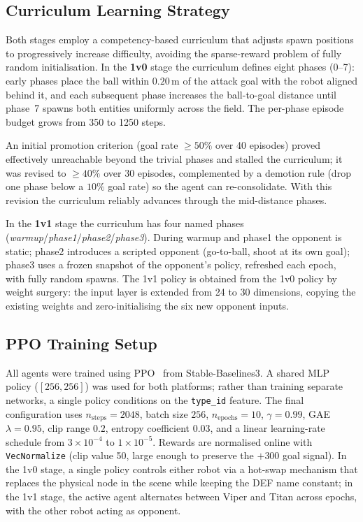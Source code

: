 \documentclass[conference]{IEEEtran}
\begin{document}
\subsection{Curriculum Learning Strategy}
Both stages employ a competency-based curriculum that adjusts spawn positions to
progressively increase difficulty, avoiding the sparse-reward problem of fully
random initialisation. In the \textbf{1v0} stage the curriculum defines eight
phases (0--7): early phases place the ball within $0.20\,\mathrm{m}$ of the attack
goal with the robot aligned behind it, and each subsequent phase increases the
ball-to-goal distance until phase~7 spawns both entities uniformly across the
field. The per-phase episode budget grows from 350 to 1250 steps.

An initial promotion criterion (goal rate $\geq 50\%$ over 40 episodes) proved
effectively unreachable beyond the trivial phases and stalled the curriculum; it
was revised to $\geq 40\%$ over 30 episodes, complemented by a demotion rule (drop
one phase below a $10\%$ goal rate) so the agent can re-consolidate. With this
revision the curriculum reliably advances through the mid-distance phases.

In the \textbf{1v1} stage the curriculum has four named phases
(\textit{warmup}/\textit{phase1}/\textit{phase2}/\textit{phase3}). During warmup and
phase1 the opponent is static; phase2 introduces a scripted opponent (go-to-ball,
shoot at its own goal); phase3 uses a frozen snapshot of the opponent's policy,
refreshed each epoch, with fully random spawns. The 1v1 policy is obtained from the
1v0 policy by weight surgery: the input layer is extended from 24 to 30 dimensions,
copying the existing weights and zero-initialising the six new opponent inputs.

\subsection{PPO Training Setup} \label{sec:ppo_setup}
All agents were trained using PPO~\cite{schulman2017ppo} from Stable-Baselines3. A
shared MLP policy ($[256,256]$) was used for both platforms; rather than training
separate networks, a single policy conditions on the \texttt{type\_id} feature.
The final configuration uses $n_{\text{steps}} = 2048$, batch size $256$,
$n_{\text{epochs}} = 10$, $\gamma = 0.99$, GAE $\lambda = 0.95$, clip range $0.2$,
entropy coefficient $0.03$, and a linear learning-rate schedule from
$3\times10^{-4}$ to $1\times10^{-5}$. Rewards are normalised online with
\texttt{VecNormalize} (clip value 50, large enough to preserve the $+300$ goal
signal). In the 1v0 stage, a single policy controls either robot via a hot-swap
mechanism that replaces the physical node in the scene while keeping the DEF name
constant; in the 1v1 stage, the active agent alternates between Viper and Titan
across epochs, with the other robot acting as opponent.
\end{document}
